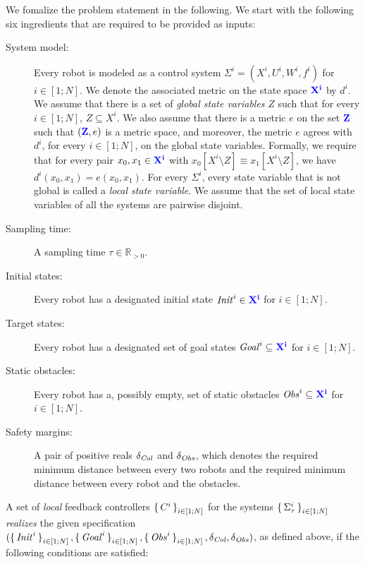 We fomalize the problem statement in the following.
We start with the following six ingredients that are required to be provided as inputs:
\begin{description}
	\item[System model:] Every robot is modeled as a control system $\Sigma^i = (X^i, U^i, W^i, f^i)$ for $i\in [1;N]$. 
	We denote the associated metric on the state space ${\color{blue} \mathbf{X^i}}$ by $d^i$.
	We assume that there is a set of \emph{global state variables} $Z$ such that for every $i\in [1;N]$, $Z\subseteq X^i$.
	We also assume that there is a metric $e$ on the set ${\color{blue} \mathbf{Z}}$ such that $({\color{blue} \mathbf{Z}},e)$ is a metric space, and moreover, the metric $e$ agrees with $d^i$, for every $i\in [1;N]$, on the global state variables.
	Formally, we require that for every pair $x_0,x_1\in {\color{blue} \mathbf{X^i}}$ with $x_0[X^i\setminus Z]\equiv x_1[X^i\setminus Z]$, we have $d^i(x_0,x_1)=e(x_0,x_1)$.
	For every $\Sigma^i$, every state variable that is not global is called a \emph{local state variable}.
	We assume that the set of local state variables of all the systems are pairwise disjoint. 
	\item[Sampling time:] A sampling time $\tau\in \mathbb{R}_{>0}$.
	\item[Initial states:] Every robot has a designated initial state $\mathit{Init}^i\in {\color{blue} \mathbf{X^i}}$ for $i\in [1;N]$.
	\item[Target states:] Every robot has a designated set of goal states $\mathit{Goal}^i\subseteq {\color{blue} \mathbf{X^i}}$  for $i\in [1;N]$.
	\item[Static obstacles:] Every robot has a, possibly empty, set of static obstacles $\mathit{Obs}^i\subseteq {\color{blue} \mathbf{X^i}}$  for $i\in [1;N]$.
	\item[Safety margins:] A pair of positive reals $\delta_{\mathit{Col}}$ and $\delta_{\mathit{Obs}}$, which denotes the required minimum distance between every two robots and the required minimum distance between every robot and the obstacles.
\end{description}

A set of \emph{local} feedback controllers $\set{C^i}_{i\in [1;N]}$ for the systems $\set{\Sigma_\tau^i}_{i\in [1;N]}$ \emph{realizes} the given specification $(\set{\mathit{Init}^i}_{i\in [1;N]}, \set{\mathit{Goal}^i}_{i\in [1;N]}, \set{\mathit{Obs}^i}_{i\in [1;N]}, \delta_{\mathit{Col}}, \delta_{\mathit{Obs}})$, as defined above, if the following conditions are satisfied:


